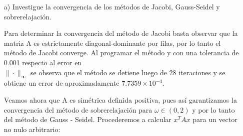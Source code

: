 \begin{enumerate}
    \item[a)] Investigue la convergencia de los métodos de Jacobi, Gauss-Seidel y sobrerelajación.

    \begin{solution}
    Para determinar la convergencia del método de Jacobi basta observar que la matriz A es estrictamente diagonal-dominante por filas, por lo tanto el método de Jacobi converge. Al programar el método y con una tolerancia de 0.001 respecto al error en \\ $\|\cdot\|_{\infty}$ se observa que el método se detiene luego de 28 iteraciones y se obtiene un error de aproximadamente $7.7359\times10^{-4}$.

    Veamos ahora que A es simétrica definida positiva, pues así garantizamos la convergencia del método de sobrerelajación para $\omega \in (0,2)$ y por lo tanto del método de Gauss - Seidel. Procederemos a calcular $x^TAx$ para un vector no nulo arbitrario:


\end{solution}
\end{enumerate}
